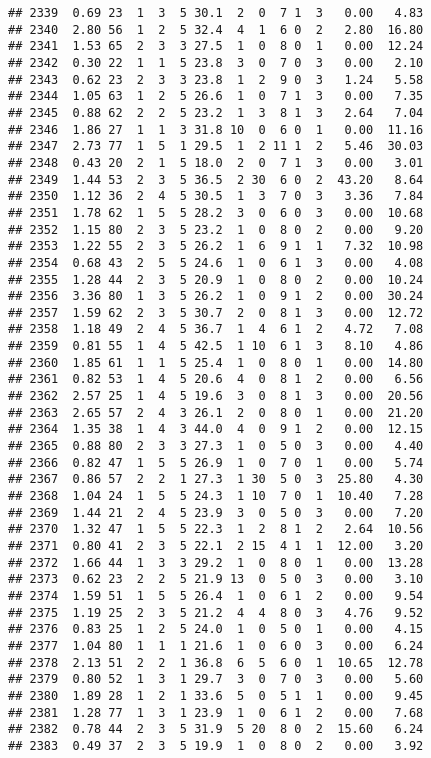 \documentclass[
]{article}
\begin{document}
\begin{verbatim}
## 2339  0.69 23  1  3  5 30.1  2  0  7 1  3   0.00   4.83
## 2340  2.80 56  1  2  5 32.4  4  1  6 0  2   2.80  16.80
## 2341  1.53 65  2  3  3 27.5  1  0  8 0  1   0.00  12.24
## 2342  0.30 22  1  1  5 23.8  3  0  7 0  3   0.00   2.10
## 2343  0.62 23  2  3  3 23.8  1  2  9 0  3   1.24   5.58
## 2344  1.05 63  1  2  5 26.6  1  0  7 1  3   0.00   7.35
## 2345  0.88 62  2  2  5 23.2  1  3  8 1  3   2.64   7.04
## 2346  1.86 27  1  1  3 31.8 10  0  6 0  1   0.00  11.16
## 2347  2.73 77  1  5  1 29.5  1  2 11 1  2   5.46  30.03
## 2348  0.43 20  2  1  5 18.0  2  0  7 1  3   0.00   3.01
## 2349  1.44 53  2  3  5 36.5  2 30  6 0  2  43.20   8.64
## 2350  1.12 36  2  4  5 30.5  1  3  7 0  3   3.36   7.84
## 2351  1.78 62  1  5  5 28.2  3  0  6 0  3   0.00  10.68
## 2352  1.15 80  2  3  5 23.2  1  0  8 0  2   0.00   9.20
## 2353  1.22 55  2  3  5 26.2  1  6  9 1  1   7.32  10.98
## 2354  0.68 43  2  5  5 24.6  1  0  6 1  3   0.00   4.08
## 2355  1.28 44  2  3  5 20.9  1  0  8 0  2   0.00  10.24
## 2356  3.36 80  1  3  5 26.2  1  0  9 1  2   0.00  30.24
## 2357  1.59 62  2  3  5 30.7  2  0  8 1  3   0.00  12.72
## 2358  1.18 49  2  4  5 36.7  1  4  6 1  2   4.72   7.08
## 2359  0.81 55  1  4  5 42.5  1 10  6 1  3   8.10   4.86
## 2360  1.85 61  1  1  5 25.4  1  0  8 0  1   0.00  14.80
## 2361  0.82 53  1  4  5 20.6  4  0  8 1  2   0.00   6.56
## 2362  2.57 25  1  4  5 19.6  3  0  8 1  3   0.00  20.56
## 2363  2.65 57  2  4  3 26.1  2  0  8 0  1   0.00  21.20
## 2364  1.35 38  1  4  3 44.0  4  0  9 1  2   0.00  12.15
## 2365  0.88 80  2  3  3 27.3  1  0  5 0  3   0.00   4.40
## 2366  0.82 47  1  5  5 26.9  1  0  7 0  1   0.00   5.74
## 2367  0.86 57  2  2  1 27.3  1 30  5 0  3  25.80   4.30
## 2368  1.04 24  1  5  5 24.3  1 10  7 0  1  10.40   7.28
## 2369  1.44 21  2  4  5 23.9  3  0  5 0  3   0.00   7.20
## 2370  1.32 47  1  5  5 22.3  1  2  8 1  2   2.64  10.56
## 2371  0.80 41  2  3  5 22.1  2 15  4 1  1  12.00   3.20
## 2372  1.66 44  1  3  3 29.2  1  0  8 0  1   0.00  13.28
## 2373  0.62 23  2  2  5 21.9 13  0  5 0  3   0.00   3.10
## 2374  1.59 51  1  5  5 26.4  1  0  6 1  2   0.00   9.54
## 2375  1.19 25  2  3  5 21.2  4  4  8 0  3   4.76   9.52
## 2376  0.83 25  1  2  5 24.0  1  0  5 0  1   0.00   4.15
## 2377  1.04 80  1  1  1 21.6  1  0  6 0  3   0.00   6.24
## 2378  2.13 51  2  2  1 36.8  6  5  6 0  1  10.65  12.78
## 2379  0.80 52  1  3  1 29.7  3  0  7 0  3   0.00   5.60
## 2380  1.89 28  1  2  1 33.6  5  0  5 1  1   0.00   9.45
## 2381  1.28 77  1  3  1 23.9  1  0  6 1  2   0.00   7.68
## 2382  0.78 44  2  3  5 31.9  5 20  8 0  2  15.60   6.24
## 2383  0.49 37  2  3  5 19.9  1  0  8 0  2   0.00   3.92

\end{verbatim}
\end{document}
